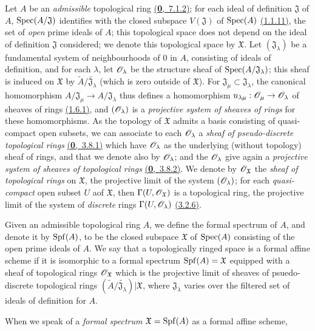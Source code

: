 \begin{env}[10.1.1]
\label{env-1.10.1.1}
Let $A$ be an {\em admissible} topological ring \hyperref[defn-0.7.1.2]{(\textbf{0},~7.1.2)}; for each
ideal of definition $\mathfrak{J}$ of $A$, ${\mathop{\mathrm{Spec}}\nolimits}(A/\mathfrak{J})$ identifies
with the closed subspace $V(\mathfrak{J})$ of ${\mathop{\mathrm{Spec}}\nolimits}(A)$ \hyperref[prop-1.1.1.11]{(1.1.11)},
the set of {\em open} prime ideals of $A$; this topological space does not depend
on the ideal of definition $\mathfrak{J}$ considered; we denote this topological
space by $\mathfrak{X}$. Let $(\mathfrak{J}_\lambda)$ be a fundamental system
of neighbourhoods of $0$ in $A$, consisting of ideals of definition, and for each
$\lambda$, let $\mathscr{O}_\lambda$ be the structure sheaf of
${\mathop{\mathrm{Spec}}\nolimits}(A/\mathfrak{J}_\lambda)$; this sheaf is induced on $\mathfrak{X}$ by
$\widetilde{A}/\widetilde{\mathfrak{J}_\lambda}$ (which is zero outside of
$\mathfrak{X}$). For $\mathfrak{J}_\mu\subset\mathfrak{J}_\lambda$, the
canonical homomorphism $A/\mathfrak{J}_\mu\to A/\mathfrak{J}_\lambda$ thus
defines a homomorphism $u_{\lambda\mu}:\mathscr{O}_\mu\to\mathscr{O}_\lambda$ of sheaves of
rings \hyperref[env-1.1.6.1]{(1.6.1)}, and $(\mathscr{O}_\lambda)$ is a {\em projective system of
sheaves of rings} for these homomorphisms. As the topology of $\mathfrak{X}$
admits a basis consisting of quasi-compact open subsets, we can associate to
each $\mathscr{O}_\lambda$ a {\em sheaf of pseudo-discrete topological rings}
\hyperref[env-0.3.8.1]{(\textbf{0},~3.8.1)} which have $\mathscr{O}_\lambda$ as the underlying (without topology)
sheaf of rings, and that we denote also by $\mathscr{O}_\lambda$; and the $\mathscr{O}_\lambda$ give again a
{\em projective system of sheaves of topological rings} \hyperref[env-0.3.8.2]{(\textbf{0},~3.8.2)}.
We denote by $\mathscr{O}_\mathfrak{X}$ the {\em sheaf of topological rings} on $\mathfrak{X}$, the
projective limit of the system $(\mathscr{O}_\lambda)$; for each {\em quasi-compact} open subset $U$
aof $\mathfrak{X}$, then $\Gamma(U,\mathscr{O}_\mathfrak{X})$ is a topological ring, the projective
limit of the system of {\em discrete} rings $\Gamma(U,\mathscr{O}_\lambda)$
\hyperref[env-0.3.2.6]{(3.2.6)}.
\end{env}

\begin{defn}[10.1.2]
\label{defn-1.10.1.2}
Given an admissible topological ring $A$, we define the formal spectrum of $A$, and denote
it by ${\mathop{\mathrm{Spf}}\nolimits}(A)$, to be the closed subspace $\mathfrak{X}$ of ${\mathop{\mathrm{Spec}}\nolimits}(A)$ consisting of the
open prime ideals of $A$. We say that a topologically ringed space is a formal affine scheme
if it is isomorphic to a formal spectrum ${\mathop{\mathrm{Spf}}\nolimits}(A)=\mathfrak{X}$ equipped with a sheaf of
topological rings $\mathscr{O}_\mathfrak{X}$ which is the projective limit of sheaves of
psuedo-discrete topological rings
$(\widetilde{A}/\widetilde{\mathfrak{J}_\lambda})|\mathfrak{X}$, where $\mathfrak{J}_\lambda$
varies over the filtered set of ideals of definition for $A$.
\end{defn}

When we speak of a {\em formal spectrum $\mathfrak{X}={\mathop{\mathrm{Spf}}\nolimits}(A)$} as a formal affine scheme,






